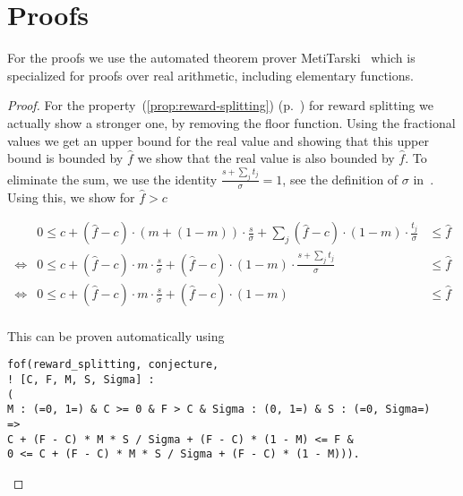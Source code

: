 \section{Proofs}
\label{sec:proofs}

\newif\ifproofs

For the proofs we use the automated theorem prover
MetiTarski~\cite{DBLP:journals/jar/AkbarpourP10} which is specialized for proofs
over real arithmetic, including elementary functions.

\begin{proof}
  For the property~(\ref{prop:reward-splitting})
  (p.~\pageref{prop:reward-splitting}) for reward splitting we actually show a
  stronger one, by removing the floor function. Using the fractional values we
  get an upper bound for the real value and showing that this upper bound is
  bounded by $\hat{f}$ we show that the real value is also bounded by
  $\hat{f}$. To eliminate the sum, we use the identity $\frac{s +
    \sum_{j}t_{j}}{\sigma} = 1$, see the definition of
  $\sigma$ in~\cite{delegation_design}. Using this, we show for $\hat{f} > c$

  \begin{equation*}
    \begin{array}{cll}
      & 0 \leq c + (\hat{f} - c)\cdot (m + (1 - m))\cdot \frac{s}{\sigma} +
        \sum_{j}(\hat{f}-c)\cdot(1-m)\cdot\frac{t_{j}}{\sigma} & \leq \hat{f} \\
      \Leftrightarrow &
                        0\leq c + (\hat{f}-c)\cdot m \cdot \frac{s}{\sigma} + (\hat{f}
                        -c)\cdot(1-m)\cdot\frac{s + \sum_{j}t_{j}}{\sigma} & \leq \hat{f} \\
      \Leftrightarrow &
                        0\leq c + (\hat{f}-c)\cdot m \cdot \frac{s}{\sigma} + (\hat{f}
                        -c)\cdot(1-m) & \leq \hat{f} \\
    \end{array}
  \end{equation*}

  This can be proven automatically using

\begin{verbatim}
fof(reward_splitting, conjecture,
! [C, F, M, S, Sigma] :
(
M : (=0, 1=) & C >= 0 & F > C & Sigma : (0, 1=) & S : (=0, Sigma=)
=>
C + (F - C) * M * S / Sigma + (F - C) * (1 - M) <= F &
0 <= C + (F - C) * M * S / Sigma + (F - C) * (1 - M))).
\end{verbatim}


\end{proof}
